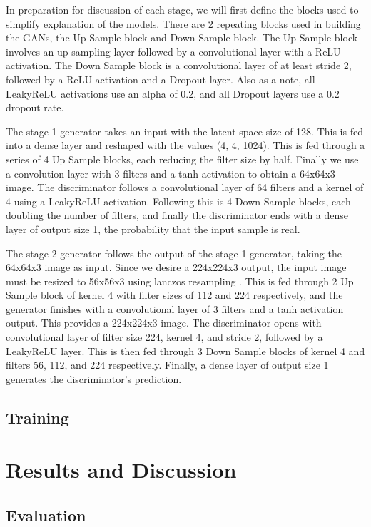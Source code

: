 \documentclass{article}
\begin{document}
	In preparation for discussion of each stage, we will first define the blocks used to simplify explanation of the models. There are 2 repeating blocks used in building the GANs, the Up Sample block and Down Sample block. The Up Sample block involves an up sampling layer followed by a convolutional layer with a ReLU activation. The Down Sample block is a convolutional layer of at least stride 2, followed by a ReLU activation and a Dropout layer. Also as a note, all LeakyReLU activations use an alpha of 0.2, and all Dropout layers use a 0.2 dropout rate.

	The stage 1 generator takes an input with the latent space size of 128. This is fed into a dense layer and reshaped with the values (4, 4, 1024). This is fed through a series of 4 Up Sample blocks, each reducing the filter size by half. Finally we use a convolution layer with 3 filters and a tanh activation to obtain a 64x64x3 image. The discriminator follows a convolutional layer of 64 filters and a kernel of 4 using a LeakyReLU activation. Following this is 4 Down Sample blocks, each doubling the number of filters, and finally the discriminator ends with a dense layer of output size 1, the probability that the input sample is real.

	The stage 2 generator follows the output of the stage 1 generator, taking the 64x64x3 image as input. Since we desire a 224x224x3 output, the input image must be resized to 56x56x3 using lanczos resampling \cite{lanczos}. This is fed through 2 Up Sample block of kernel 4 with filter sizes of 112 and 224 respectively, and the generator finishes with a convolutional layer of 3 filters  and a tanh activation output. This provides a 224x224x3 image. The discriminator opens with convolutional layer of filter size 224, kernel 4, and stride 2, followed by a LeakyReLU layer. This is then fed through 3 Down Sample blocks of kernel 4 and filters 56, 112, and 224 respectively. Finally, a dense layer of output size 1 generates the discriminator’s prediction.

	\subsection{Training}

	\section{Results and Discussion}
	

	\subsection{Evaluation}	
\end{document}

